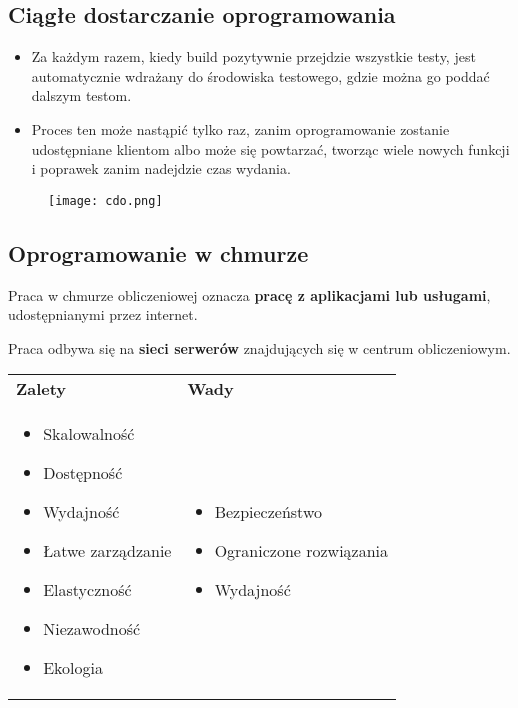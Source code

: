 \documentclass[a4paper]{article}
\begin{document}
    \subsection{Ciągłe dostarczanie oprogramowania}
    \begin{itemize}
        \item Za każdym razem, kiedy build pozytywnie przejdzie wszystkie testy, jest automatycznie wdrażany do
        środowiska testowego, gdzie można go poddać dalszym testom.
        \item Proces ten może nastąpić tylko raz, zanim oprogramowanie zostanie udostępniane klientom
        albo może się powtarzać, tworząc wiele nowych funkcji i poprawek zanim nadejdzie czas wydania.
    \end{itemize}


    \begin{figure}[H]
        \texttt{[image: cdo.png]}
    \end{figure}


    \subsection{Oprogramowanie w chmurze}
    Praca w chmurze obliczeniowej oznacza \textbf{pracę z aplikacjami lub usługami}, udostępnianymi przez
    internet.

    Praca odbywa się na \textbf{sieci serwerów} znajdujących się w centrum obliczeniowym.

    \begin{table}[H]
        \begin{center}
            \begin{tabular}{ p{.5\linewidth} p{.5\linewidth}}
                \textbf{Zalety} & \textbf{Wady}\\

                \begin{itemize}
                    \item Skalowalność
                    \item Dostępność
                    \item Wydajność
                    \item Łatwe zarządzanie
                    \item Elastyczność
                    \item Niezawodność
                    \item Ekologia
                \end{itemize}
                &
                \begin{itemize}
                    \item Bezpieczeństwo
                    \item Ograniczone rozwiązania
                    \item Wydajność
                \end{itemize}
            \end{tabular}
        \end{center}
    \end{table}
\end{document}
